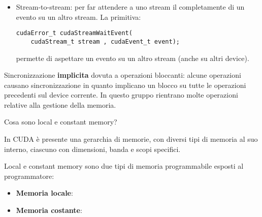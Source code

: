 \documentclass[12pt, answers]{exam}
\begin{document}
\begin{questions}
\begin{solution}
\begin{itemize}
            \item Stream-to-stream: per far attendere a uno stream il completamente di un evento su un altro stream. La primitiva:
            \begin{verbatim}
cudaError_t cudaStreamWaitEvent(
    cudaStream_t stream , cudaEvent_t event);
            \end{verbatim}
            permette di aspettare un evento su un altro stream (anche su altri device).
        \end{itemize}
        
        Sincronizzazione \textbf{implicita} dovuta a operazioni bloccanti: alcune operazioni causano sincronizzazione in quanto implicano un blocco su tutte le operazioni precedenti sul device corrente. In questo gruppo rientrano molte operazioni relative alla gestione della memoria.
        
    \end{solution}
    
    \question Cosa sono local e constant memory?
    \begin{solution}
        In CUDA è presente una gerarchia di memorie, con diversi tipi di memoria al suo interno, ciascuno con dimensioni, banda e scopi specifici. 
        
        Local e constant memory sono due tipi di memoria programmabile esposti al programmatore: 
        \begin{itemize}
            \item \textbf{Memoria locale}:
            
            \item \textbf{Memoria costante}:
        \end{itemize}
    \end{solution}
\end{questions}
\end{document}
